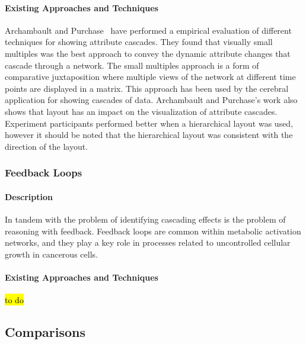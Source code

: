 \paragraph{Existing Approaches and Techniques}

Archambault and Purchase~\cite{Archambault2016} have performed a empirical evaluation of different techniques for showing attribute cascades.
They found that visually small multiples was the best approach to convey the dynamic attribute changes that cascade through a network.
The small multiples approach is a form of comparative juxtaposition where multiple views of the network at different time points are displayed in a matrix.
This approach has been used by the cerebral application for showing cascades of data.
Archambault and Purchase's work also shows that layout has an impact on the visualization of attribute cascades.
Experiment participants performed better when a hierarchical layout was used, however it should be noted that the hierarchical layout was consistent with the direction of the layout.


\subsubsection{Feedback Loops}

\paragraph{Description}

In tandem with the problem of identifying cascading effects is the problem of reasoning with feedback.
Feedback loops are common within metabolic activation networks, and they play a key role in processes related to uncontrolled cellular growth in cancerous cells.

\paragraph{Existing Approaches and Techniques}

\hl{to do}

\subsection{Comparisons}

